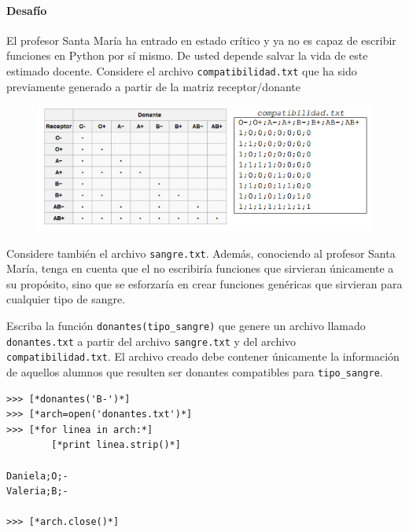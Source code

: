 \paragraph{Desafío} El profesor Santa María ha entrado en estado crítico y ya no es capaz de escribir funciones en Python por sí mismo. De usted depende salvar la vida de este estimado docente.
Considere el archivo \texttt{compatibilidad.txt} que ha sido previamente generado a partir de la matriz receptor/donante

\begin{figure}[h]
    \centering
    \includegraphics{Imagenes/compatibilidad.png}
\end{figure}

Considere también el archivo \texttt{sangre.txt}. Además, conociendo al profesor Santa María, tenga en cuenta que el no escribiría funciones que sirvieran únicamente a su propósito, sino que se esforzaría en crear funciones genéricas que sirvieran para cualquier tipo de sangre.


Escriba la función \texttt{donantes(tipo\_sangre)} que genere un archivo llamado \texttt{donantes.txt} a partir del archivo \texttt{sangre.txt} y del archivo \texttt{compatibilidad.txt}. El archivo creado debe contener únicamente la información de aquellos alumnos que resulten ser donantes compatibles para \texttt{tipo\_sangre}.

\begin{lstlisting}[style=consola]
>>> [*donantes('B-')*]
>>> [*arch=open('donantes.txt')*]
>>> [*for linea in arch:*]
        [*print linea.strip()*]

Daniela;O;-
Valeria;B;-

>>> [*arch.close()*]

\end{lstlisting}